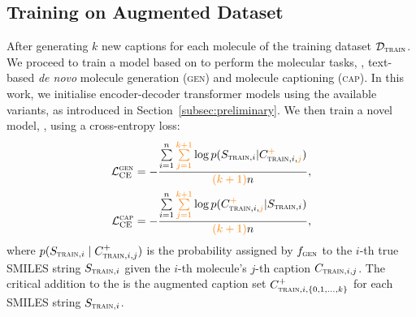 \subsection{Training on Augmented Dataset}
\label{subsec:training}

% 

After generating $k$ new captions for each molecule of the training dataset $\mathcal{D}_{\textsc{train}}$. 
We proceed to train a model based on \newdataset to perform the molecular tasks, \ie, text-based \emph{de novo} molecule generation (\textsc{gen}) and molecule captioning (\textsc{cap}). 
% 
In this work, we initialise encoder-decoder transformer models using the available \oldmodel variants, as introduced in Section~\ref{subsec:preliminary}. 
We then train a novel model, \newmodel, using a cross-entropy loss:
\begin{align}
\begin{split}
    \mathcal{L}_{\text{CE}}^{\textsc{gen}} &= - \frac{\sum\limits_{i = 1}^{n} \textcolor{orange}{\sum\limits_{j = 1}^{k+1}} \log p(S_{\textsc{train}, i} \vert C^{\textcolor{orange}{+}}_{\textsc{train}, i, \textcolor{orange}{j}})}{\textcolor{orange}{(k+1)}n},\\
    \mathcal{L}_{\text{CE}}^{\textsc{cap}} &= - \frac{\sum\limits_{i = 1}^{n} \textcolor{orange}{\sum\limits_{j = 1}^{k+1}} \log p(C^{\textcolor{orange}{+}}_{\textsc{train}, i, \textcolor{orange}{j}} \vert S_{\textsc{train}, i})}{\textcolor{orange}{(k+1)}n},
\end{split}
\label{eq:lamolt5}
\end{align}
where $p(S_{\textsc{train}, i} \;\vert\; C^+_{\textsc{train}, i, j})$ is the probability assigned by $f_{\textsc{gen}}$ to the $i$-th true SMILES string $S_{\textsc{train}, i}$ given the $i$-th molecule's $j$-th caption $C_{\textsc{train}, i, j}$. 
% 
The critical addition to the \oldmodel is the augmented caption set $C^+_{\textsc{train}, i, \{0, 1, \dots, k \}}$ for each SMILES string $S_{\textsc{train}, i}$. 
